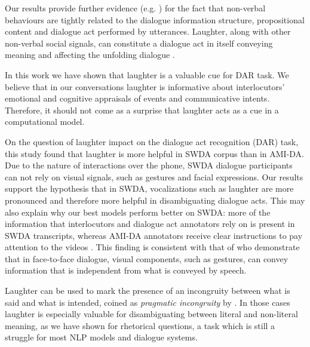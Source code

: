 \documentclass[11pt,a4paper]{article}
\begin{document}
Our results provide further evidence
(e.g. \citet{torres1997modeling,mazzocconi2021looking}) for the fact that
non-verbal behaviours are tightly related to the dialogue information
structure, propositional content and  dialogue act performed by
utterances.
Laughter, along with other non-verbal social signals, can constitute a
dialogue act in itself conveying meaning and affecting the unfolding
 dialogue \citep{bavelas2000visible,ginzburg2020laughter}.


In this work we have shown that laughter is a valuable cue for DAR
task. We believe that in our conversations laughter is informative
about interlocutors' emotional and cognitive appraisals of events and
communicative intents. %
Therefore, it should not come as a surprise
that laughter
acts as a cue in a computational model.

On the question of laughter impact on the dialogue act recognition
(DAR) task, this study found that laughter is more helpful in SWDA
corpus than in AMI-DA.  Due to the nature of interactions over the
phone, SWDA dialogue participants can not rely on visual signals, such
as gestures and facial expressions.  Our results support the
hypothesis that in SWDA, vocalizations such as laughter are more
pronounced and therefore more helpful in disambiguating dialogue acts.
This may also explain why our best models perform better on SWDA:
more of the information that interlocutors and dialogue act annotators
rely on is present in SWDA transcripts, whereas AMI-DA annotators receive
clear instructions to pay attention to the videos
\citep{GuidelinesDialogueAct2005}.  This finding is consistent with
that of \citet{bavelas2008gesturing} who demonstrate that in
face-to-face dialogue, visual components, such as gestures, can convey
information that is independent from what is conveyed by speech.

Laughter can be used to mark the presence of an incongruity between
what is said and what is intended, coined as \emph{pragmatic
  incongruity} by \citet{mazzocconiTAC}. In those cases laughter is
especially valuable for disambiguating between literal and non-literal
meaning, as we have shown for rhetorical questions, a task which is
still a struggle for most NLP models and dialogue systems.
\end{document}
